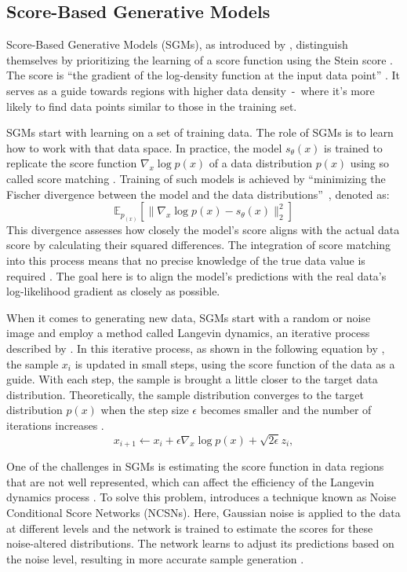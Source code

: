 \subsection{Score-Based Generative Models}\label{SGMs}

Score-Based Generative Models (SGMs), as introduced by \citeauthor{song2019SGM}, distinguish themselves by prioritizing the learning of a score function using the Stein score \citep{steinScore}. The score is ``the gradient of the log-density function at the input data point'' \citep{song2019SGM}. It serves as a guide towards regions with higher data density~-~where it's more likely to find data points similar to those in the training set.

SGMs start with learning on a set of training data. The role of SGMs is to learn how to work with that data space. In practice, the model \(s_\theta(x)\) is trained to replicate the score function \(\nabla_x \log{p(x)}\) of a data distribution \(p(x)\) using so called score matching \citep{hyvarinenScoreMatching}. Training of such models is achieved by ``minimizing the Fischer divergence between the model and the data distributions''~\citeauthor{song2021score}, denoted as: \[
\mathbb{E}_{p_{(x)}} \left[ \| \nabla_x \log{p(x)} - s_\theta(x) \| ^2_2 \right]
\] This divergence assesses how closely the model's score aligns with the actual data score by calculating their squared differences. The integration of score matching into this process means that no precise knowledge of the true data value is required \citep{song2021score}. The goal here is to align the model's predictions with the real data's log-likelihood gradient as closely as possible.

When it comes to generating new data, SGMs start with a random or noise image and employ a method called Langevin dynamics, an iterative process described by \citep{robertsLangevin}. In this iterative process, as shown in the following equation by \citeauthor{song2021score}, the sample \(x_i\) is updated in small steps, using the score function of the data as a guide. With each step, the sample is brought a little closer to the target data distribution. Theoretically, the sample distribution converges to the target distribution \(p(x)\) when the step size \(\epsilon\) becomes smaller and the number of iterations increases \citep{song2019SGM,song2021score}.\[ 
  x_{i+1} \leftarrow x_i + \epsilon \nabla_x \log p(x) + \sqrt{2 \epsilon} z_i,
\]

One of the challenges in SGMs is estimating the score function in data regions that are not well represented, which can affect the efficiency of the Langevin dynamics process \citep{song2019SGM}. To solve this problem, \citeauthor{song2019SGM} introduces a technique known as Noise Conditional Score Networks (NCSNs). Here, Gaussian noise is applied to the data at different levels and the network is trained to estimate the scores for these noise-altered distributions. The network learns to adjust its predictions based on the noise level, resulting in more accurate sample generation \citep{song2019SGM}.

